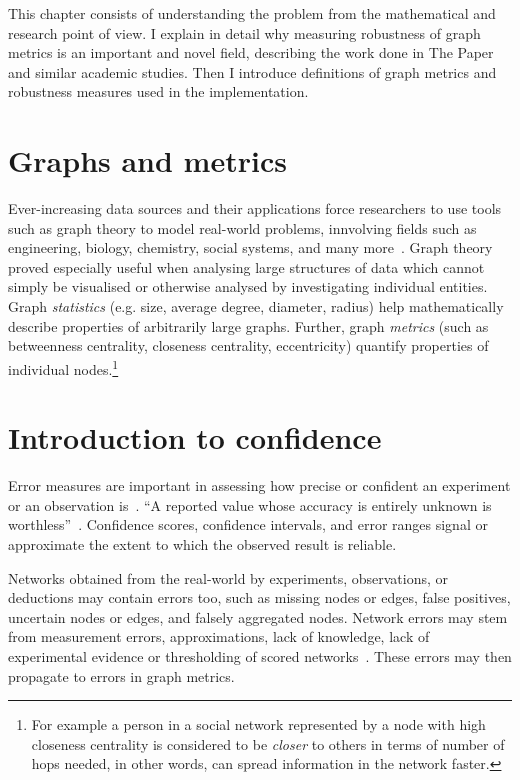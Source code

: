 This chapter consists of understanding the problem from the mathematical and research point of view.
I explain in detail why measuring robustness of graph metrics is an important and novel field, describing the work done in The Paper and similar academic studies.
Then I introduce definitions of graph metrics and robustness measures used in the implementation.


\section{Graphs and metrics}

Ever-increasing data sources and their applications force researchers to use tools such as graph theory to model real-world problems, innvolving fields such as engineering, biology, chemistry, social systems, and many more~\cite{FouldsGraphTheoryApplications2012}.
Graph theory proved especially useful when analysing large structures of data which cannot simply be visualised or otherwise analysed by investigating individual entities.
Graph \textsl{statistics} (e.g. size, average degree, diameter, radius) help mathematically describe properties of arbitrarily large graphs.
Further, graph \textsl{metrics} (such as betweenness centrality, closeness centrality, eccentricity) quantify properties of individual nodes.\footnote{For example a person in a social network represented by a node with high closeness centrality is considered to be \textsl{closer} to others in terms of number of hops needed, in other words, can spread information in the network faster.}


\section{Introduction to confidence}

Error measures are important in assessing how precise or confident an experiment or an observation is~\cite{Curran-EverettExplorationsStatisticsStandard2008}.
\enquote{A reported value whose accuracy is entirely unknown is worthless}~\cite{EisenhartExpressionUncertaintiesFinal1968}.
Confidence scores, confidence intervals, and error ranges signal or approximate the extent to which the observed result is reliable.

Networks obtained from the real-world by experiments, observations, or deductions may contain errors too, such as missing nodes or edges, false positives, uncertain nodes or edges, and falsely aggregated nodes.
Network errors may stem from measurement errors, approximations, lack of knowledge, lack of experimental evidence or thresholding of scored networks~\cite{Wang2012,MarsdenNetworkDataMeasurement1990,JonesChallengesLimitationsQuantifying2010}.
These errors may then propagate to errors in graph metrics.

